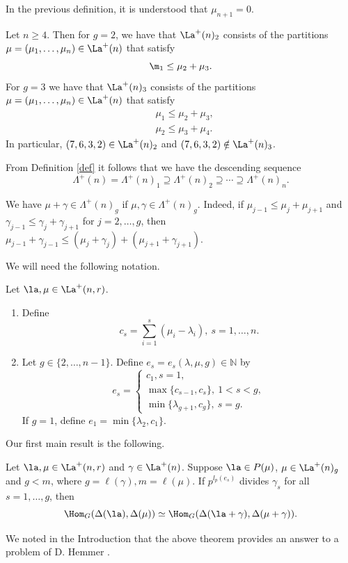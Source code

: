 	In the previous definition, it is understood that $\mu_{n+1}=0$.
\begin{exam*}Let $n \ge4$. Then for $g=2$, we have that $\La^{+}(n)_2$ consists of the partitions $\mu=(\mu_1, \dots, \mu_n) \in \La^{+}(n)$ that satisfy \[\m_1 \le \mu_2+\mu_3. \]
For $g=3$ we have that $\La^{+}(n)_3$ consists of the partitions $\mu=(\mu_1, \dots, \mu_n) \in \La^{+}(n)$ that satisfy \begin{align*}
	&\mu_1 \le \mu_2+\mu_3,\\
	&\mu_2 \le \mu_3+\mu_4.
\end{align*}
In particular, $(7,6,3,2) \in \La^{+}(n)_2$ and $(7,6,3,2) \notin \La^{+}(n)_3$.
\end{exam*}
From Definition \ref{def} it follows that we have the descending sequence \[\Lambda^+(n) = \Lambda^+(n)_1 \supseteq \Lambda^+(n)_2 \supseteq \cdots \supseteq  \Lambda^+(n)_n . \]
\begin{rema}\label{add}	We have  $\mu + \gamma \in \Lambda^+(n)_g$ if $\mu, \gamma \in \Lambda^+(n)_g.$ Indeed, if $\mu_{j-1} \le \mu_j +\mu_{j+1}$ and $\gamma_{j-1} \le \gamma_j +\gamma_{j+1}$ for $j=2, \dots, g$, then $\mu_{j-1} +\gamma_{j-1} \le (\mu_j +\gamma_j) + (\mu_{j+1} +\gamma_{j+1}).$\end{rema}
	We will need the following notation. \begin{defi}\label{defce} Let $\la, \mu \in \La^{+}(n,r)$.  \begin{enumerate}\item Define \[c_s= \sum_{i=1}^{s}(\mu_i - \lambda_i), \ s=1,\dots,n.\] \item Let $g \in \{2,\dots,n-1\}$. Define $e_s=e_s(\lambda, \mu, g) \in \mathbb{N}$ by
	\begin{equation}\label{e}
		e_s=\begin{cases} c_1, s=1,\\
			\max\{c_{s-1},c_s\}, \ 1<s<g,\\
			\min\{\lambda_{g+1}, c_g\}, \ s=g.
	\end{cases}\end{equation}
If $g=1$, define $e_1 =\min\{\lambda_{2}, c_1\}$. \end{enumerate}\end{defi}
	Our first main result is the following.
	\begin{theo}\label{thm13}Let $\la, \mu \in \La^{+}(n,r)$ and  $\gamma \in \La^{+}(n)$. Suppose $\la \in P(\mu)$, $\mu \in \La^{+}(n)_g$ and $g<m$, where $g=\ell(\gamma), m=\ell(\mu)$. If $p^{l_p(e_s)}$ divides $\gamma_s$ for all $s=1,\dots,g$, then
	\[\Hom_G(\Delta(\la),\Delta(\mu)) \simeq \Hom_{G}(\Delta(\la+\gamma), \Delta(\mu+\gamma)).\]
			\end{theo}  
	We noted in the Introduction that the above theorem provides an answer to a problem  of D. Hemmer \cite[Problem 5.4]{Hem2}. 
	
